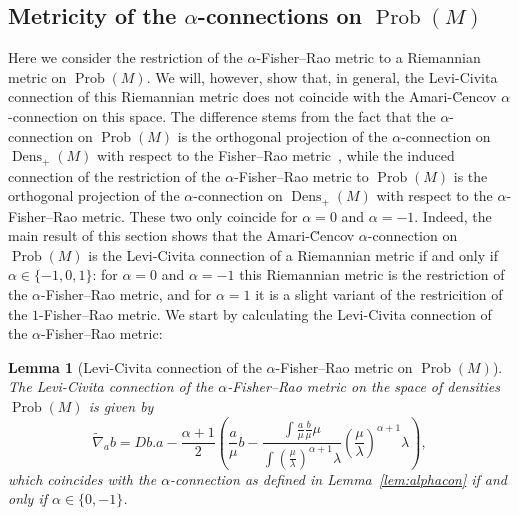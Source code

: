 \documentclass[11pt,reqno]{amsart}
\newtheorem{lemma}[theorem]{Lemma}
\theoremstyle{definition}
\newcommand{\dx}{\lambda}
\newcommand{\Prob}{\operatorname{Prob}(M)}
\newcommand{\Dens}{\operatorname{Dens}_+(M)}
\begin{document}
\subsection{Metricity of the $\alpha$-connections on $\Prob$}
Here we consider the restriction of the $\alpha$-Fisher--Rao metric to a Riemannian metric on $\Prob$.
We will, however, show that, in general, the Levi-Civita connection of this Riemannian metric does not coincide with the Amari-\u{C}encov $\alpha$-connection on this space. 
The difference stems from the fact that the $\alpha$-connection on $\Prob$ is the orthogonal projection of the $\alpha$-connection on $\Dens$ with respect to the Fisher--Rao metric~\cite{bauer2024p}, while the induced connection of the restriction of the $\alpha$-Fisher--Rao metric to $\Prob$ is the orthogonal projection of the $\alpha$-connection on $\Dens$ with respect to the $\alpha$-Fisher--Rao metric. 
These two only coincide for $\alpha=0$ and $\alpha=-1$. Indeed, the main result of this section shows that the Amari-\u{C}encov $\alpha$-connection on $\Prob$ is the Levi-Civita connection of a Riemannian metric if and only if $\alpha\in\{-1,0,1\}$: for $\alpha=0$ and $\alpha=-1$ this Riemannian metric is the restriction of the $\alpha$-Fisher--Rao metric, and for $\alpha=1$ it is a slight variant of the restricition of the $1$-Fisher--Rao metric. We start by calculating the Levi-Civita 
connection of the $\alpha$-Fisher--Rao metric:
\begin{lemma}[Levi-Civita connection of the $\alpha$-Fisher--Rao metric on $\Prob$]\label{thm:geo_alphaFR_prob}
The Levi-Civita connection of the $\alpha$-Fisher--Rao metric on the space of densities $\Prob$ is given by
\begin{equation*}
\tilde \nabla_a b = Db.a  -\frac{\alpha+1}{2} \left( \frac{a}{\mu}b-\frac{\int \frac{a}{\mu}\frac{b}{\mu} \mu}{\int \left(\frac{\mu}{\dx}\right)^{\alpha+1}\dx}\left(\frac{\mu}{\dx}\right)^{\alpha+1}\dx\right),
\end{equation*}
which coincides with the  $\alpha$-connection as defined in Lemma~\ref{lem:alphacon} if and only if $\alpha\in\{0,-1\}$.
\end{lemma}
\end{document}
